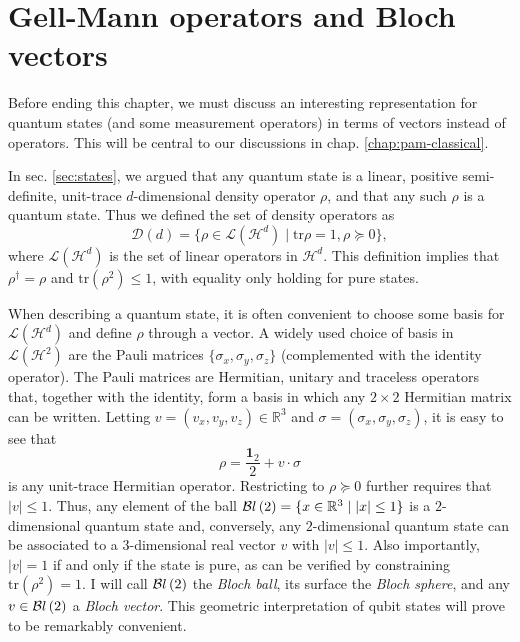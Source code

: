	\section{Gell-Mann operators and Bloch vectors}
	\label{sec:gell-mann}

		Before ending this chapter, we must discuss an interesting representation for quantum states (and some measurement operators) in terms of vectors instead of operators. This will be central to our discussions in chap. \ref{chap:pam-classical}.

		In sec. \ref{sec:states}, we argued that any quantum state is a linear, positive semi-definite, unit-trace $d$-dimensional density operator $\rho$, and that any such $\rho$ is a quantum state. Thus we defined the set of density operators as
		$$
			\mathcal{D}(d) = \{ \rho \in \mathcal{L}(\mathcal{H}^d) \mid \text{tr}\rho=1, \rho \succeq0 \} ,
		$$
		where $\mathcal{L}(\mathcal{H}^d)$ is the set of linear operators in $\mathcal{H}^d$. This definition implies that $\rho^\dagger = \rho$ and $\text{tr}(\rho^2) \leq 1$, with equality only holding for pure states.

		When describing a quantum state, it is often convenient to choose some basis for $\mathcal{L}(\mathcal{H}^d)$ and define $\rho$ through a vector. A widely used choice of basis in $\mathcal{L}(\mathcal{H}^2)$ are the Pauli matrices $\{\sigma_x, \sigma_y, \sigma_z\}$ (complemented with the identity operator). The Pauli matrices are Hermitian, unitary and traceless operators that, together with the identity, form a basis in which any $2 \times 2$ Hermitian matrix can be written. Letting $v = (v_x, v_y, v_z) \in \mathbb{R}^3$ and $\sigma = (\sigma_x, \sigma_y, \sigma_z)$, it is easy to see that
		$$
			\rho = \frac{\mathbf{1}_2}{2} + v \cdot \sigma
		$$
		is any unit-trace Hermitian operator. Restricting to $\rho \succeq 0$ further requires that $\lvert v \rvert \leq 1$. Thus, any element of the ball $\mathcal{B}l\left( 2 \right) = \{ x \in \mathbb{R}^3 \mid \lvert x \vert \leq 1 \}$ is a $2$-dimensional quantum state and, conversely, any $2$-dimensional quantum state can be associated to a $3$-dimensional real vector $v$ with $\lvert v \rvert \leq 1$. Also importantly, $\lvert v \rvert = 1$ if and only if the state is pure, as can be verified by constraining $\text{tr}(\rho^2) = 1$. I will call $\mathcal{B}l\left( 2 \right)$ the \emph{Bloch ball}, its surface the \emph{Bloch sphere}, and any $v \in \mathcal{B}l\left( 2 \right)$ a \emph{Bloch vector}. This geometric interpretation of qubit states will prove to be remarkably convenient.

